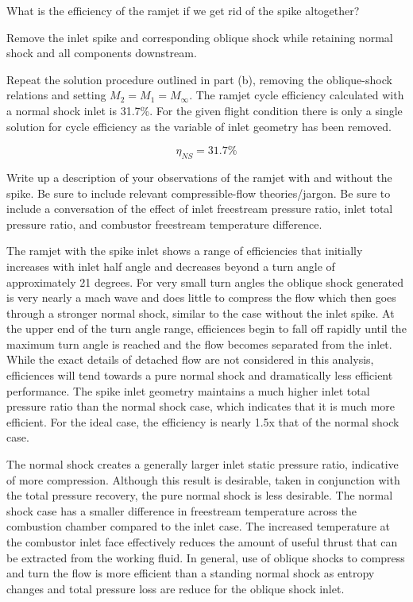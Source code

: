 \documentclass[../main.tex]{subfiles}
\begin{document}

What is the efficiency of the ramjet if we get rid of the spike altogether?

\assumptions{}
Remove the inlet spike and corresponding oblique shock while retaining normal shock and all components downstream.

\solution{}
Repeat the solution procedure outlined in part (b), removing the oblique-shock relations and setting \(M_2 = M_1 = M_\infty\).
The ramjet cycle efficiency calculated with a normal shock inlet is 31.7\%. 
For the given flight condition there is only a single solution for cycle efficiency as the variable of inlet geometry has been removed.

\[
    \eta_{NS} = 31.7\%
\]


Write up a description of your observations of the ramjet with and without the spike.
Be sure to include relevant compressible-flow theories/jargon. 
Be sure to include a conversation of the effect of inlet freestream pressure ratio, inlet total pressure ratio, and combustor freestream temperature difference.

\discussion{}
The ramjet with the spike inlet shows a range of efficiencies that initially increases with inlet half angle and decreases beyond a turn angle of approximately 21 degrees.
For very small turn angles the oblique shock generated is very nearly a mach wave and does little to compress the flow which then goes through a stronger normal shock, similar to the case without the inlet spike.
At the upper end of the turn angle range, efficiences begin to fall off rapidly until the maximum turn angle is reached and the flow becomes separated from the inlet.
While the exact details of detached flow are not considered in this analysis, efficiences will tend towards a pure normal shock and dramatically less efficient performance.
The spike inlet geometry maintains a much higher inlet total pressure ratio than the normal shock case, which indicates that it is much more efficient.
For the ideal case, the efficiency is nearly 1.5x that of the normal shock case. 

The normal shock creates a generally larger inlet static pressure ratio, indicative of more compression.
Although this result is desirable, taken in conjunction with the total pressure recovery, the pure normal shock is less desirable.
The normal shock case has a smaller difference in freestream temperature across the combustion chamber compared to the inlet case.
The increased temperature at the combustor inlet face effectively reduces the amount of useful thrust that can be extracted from the working fluid.
In general, use of oblique shocks to compress and turn the flow is more efficient than a standing normal shock as entropy changes and total pressure loss are reduce for the oblique shock inlet.
\end{document}
